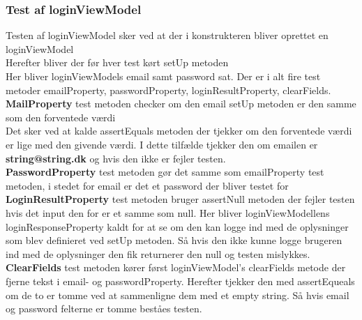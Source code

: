     \subsubsection{Test af loginViewModel}
    Testen af loginViewModel sker ved at der i konstrukteren bliver oprettet en loginViewModel\\
    Herefter bliver der før hver test kørt setUp metoden\\
    Her bliver loginViewModels email samt password sat.
    Der er i alt fire test metoder emailProperty, passwordProperty, loginResultProperty, clearFields.\\
    
    \noindent\textbf{MailProperty} test metoden checker om den email setUp metoden er den samme som den forventede værdi\\
    Det sker ved at kalde assertEquals metoden der tjekker om den forventede værdi er lige med den givende værdi. I dette tilfælde tjekker den om emailen er \textbf{string@string.dk} og hvis den ikke er fejler testen.\\
    
    \noindent\textbf{PasswordProperty} test metoden gør det samme som emailProperty test metoden, i stedet for email er det et password der bliver testet for\\
    
    \noindent\textbf{LoginResultProperty} test metoden bruger assertNull metoden der fejler testen hvis det input den for er et samme som null. Her bliver loginViewModellens loginResponseProperty kaldt for at se om den kan logge ind med de oplysninger som blev definieret ved setUp metoden. Så hvis den ikke kunne logge brugeren ind med de oplysninger den fik returnerer den null og testen mislykkes.\\
    
    \noindent\textbf{ClearFields} test metoden kører først loginViewModel’s clearFields metode der fjerne tekst i email- og passwordProperty. Herefter tjekker den med assertEqueals om de to er tomme ved at sammenligne dem med et empty string. Så hvis email og password felterne er tomme beståes testen.\\
